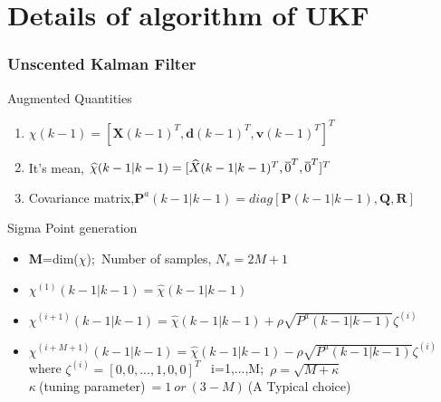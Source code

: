 \documentclass{beamer}
\begin{document}
\section{Details of algorithm of UKF}
\begin{frame}
\frametitle{Unscented Kalman Filter}
\begin{block}{Augmented Quantities}
\begin{enumerate}
    \item $\chi(k-1)=[\textbf{X}(k-1)^T, \textbf{d}(k-1)^T, \textbf{v}(k-1)^T]^T$
    \item It's mean, $\widehat{\chi}(k-1|k-1)=[\widehat{X}(k-1|k-1)^T, \overline{0}^T, \space \overline{0}^T ]^T$\\
    \item Covariance matrix,$\textbf{P}^a(k-1|k-1) = diag[\textbf{P}(k-1|k-1),  \textbf{Q},  \textbf{R}]$
\end{enumerate}


\end{block}

\begin{block}{Sigma Point generation}
\begin{itemize}
    \item \textbf{M}=dim(\textbf{$\chi$});\space \ Number of samples, $N_{s}=2M+1$
    \item $\chi^{(1)}(k-1|k-1)=\widehat{\chi}(k-1|k-1)$
    \item $\chi^{(i+1)}(k-1|k-1)=\widehat{\chi}(k-1|k-1) + \rho \sqrt{P^a(k-1|k-1)}\zeta^{(i)}$
    \item $\chi^{(i+M+1)}(k-1|k-1)=\widehat{\chi}(k-1|k-1) - \rho \sqrt{P^a(k-1|k-1)}\zeta^{(i)}$\\
    where $\zeta^{(i)}=[0,0,...,1,0,0]^T$ \ i=1,...,M;\ $\rho=\sqrt{M+\kappa}$\\
    $\kappa\ $(tuning parameter)$\ =1\ or\ (3-M) \ $(A Typical choice)
\end{itemize}
\end{block}

\end{frame}

\end{document}
